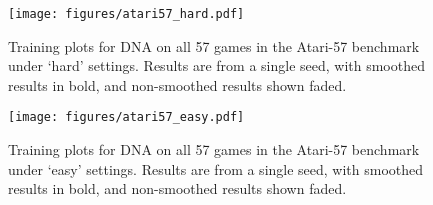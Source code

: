 \documentclass{article}
\begin{document}
\begin{figure}[h]
    \centering
    \texttt{[image: figures/atari57\_hard.pdf]}
    \caption{Training plots for DNA on all 57 games in the Atari-57 benchmark under `hard' settings. Results are from a single seed, with smoothed results in bold, and non-smoothed results shown faded.}
    \label{fig:a57_dna_hard}
\end{figure}

\begin{figure}
    \centering
    \texttt{[image: figures/atari57\_easy.pdf]}
    \caption{Training plots for DNA on all 57 games in the Atari-57 benchmark under `easy' settings. Results are from a single seed, with smoothed results in bold, and non-smoothed results shown faded.}
    \label{fig:a57_dna_easy}
\end{figure}
\end{document}
